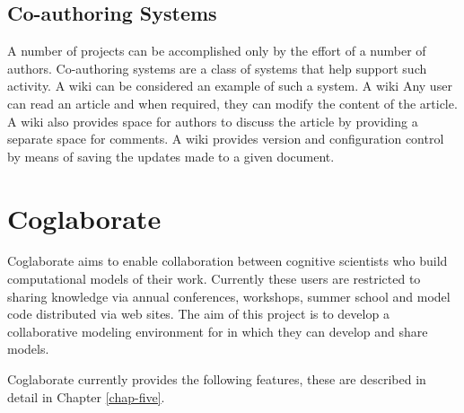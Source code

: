 
\subsection{Co-authoring Systems}

A number of projects can be accomplished only by the effort of a
number of authors. Co-authoring systems are a class of systems that
help support such activity. A wiki can be considered an example of
such a system. A wiki Any user can read an article and when required, they
can modify the content of the article. A wiki also provides space for
authors to discuss the article by providing a separate space for
comments. A wiki provides version and configuration control by means
of saving the updates made to a given document.

\section{Coglaborate}


Coglaborate aims to enable collaboration between cognitive scientists
who build computational models of their work. Currently these users
are restricted to sharing knowledge via annual conferences,
workshops, summer school and model code distributed via web sites. The
aim of this project is to develop a collaborative modeling environment
for  in which they can develop and share models. 



Coglaborate currently provides the following features, these are
described in detail in Chapter \ref{chap-five}.




